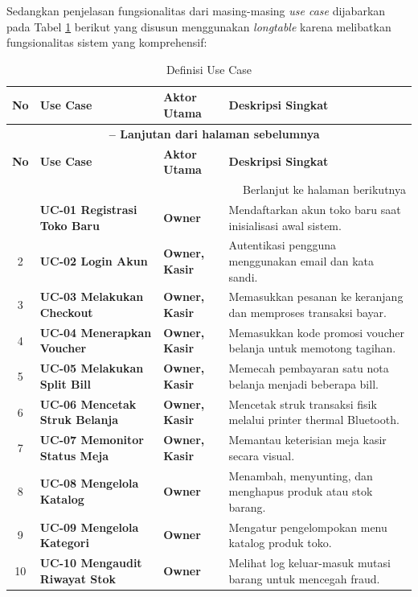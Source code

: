 Sedangkan penjelasan fungsionalitas dari masing-masing \textit{use case} dijabarkan pada Tabel \ref{tab:usecase} berikut yang disusun menggunakan \textit{longtable} karena melibatkan fungsionalitas sistem yang komprehensif:

\begin{center}
\fontsize{10pt}{12pt}\selectfont
\begin{longtable}{|c|>{\bfseries}p{3.5cm}|>{\bfseries}p{2.5cm}|p{6cm}|}
\caption{Definisi Use Case} \label{tab:usecase} \\
\hline
\textbf{No} & \textbf{Use Case} & \textbf{Aktor Utama} & \textbf{Deskripsi Singkat} \\
\hline
\endfirsthead
\multicolumn{4}{c}{{\bfseries \tablename\ \thetable{} -- Lanjutan dari halaman sebelumnya}} \\
\hline
\textbf{No} & \textbf{Use Case} & \textbf{Aktor Utama} & \textbf{Deskripsi Singkat} \\
\hline
\endhead
\hline
\multicolumn{4}{|r|}{{Berlanjut ke halaman berikutnya}} \\
\hline
\endfoot
\hline
\endlastfoot
1 & UC-01 Registrasi Toko Baru & Owner & Mendaftarkan akun toko baru saat inisialisasi awal sistem. \\
\hline
2 & UC-02 Login Akun & Owner, Kasir & Autentikasi pengguna menggunakan email dan kata sandi. \\
\hline
3 & UC-03 Melakukan Checkout & Owner, Kasir & Memasukkan pesanan ke keranjang dan memproses transaksi bayar. \\
\hline
4 & UC-04 Menerapkan Voucher & Owner, Kasir & Memasukkan kode promosi voucher belanja untuk memotong tagihan. \\
\hline
5 & UC-05 Melakukan Split Bill & Owner, Kasir & Memecah pembayaran satu nota belanja menjadi beberapa bill. \\
\hline
6 & UC-06 Mencetak Struk Belanja & Owner, Kasir & Mencetak struk transaksi fisik melalui printer thermal Bluetooth. \\
\hline
7 & UC-07 Memonitor Status Meja & Owner, Kasir & Memantau keterisian meja kasir secara visual. \\
\hline
8 & UC-08 Mengelola Katalog & Owner & Menambah, menyunting, dan menghapus produk atau stok barang. \\
\hline
9 & UC-09 Mengelola Kategori & Owner & Mengatur pengelompokan menu katalog produk toko. \\
\hline
10 & UC-10 Mengaudit Riwayat Stok & Owner & Melihat log keluar-masuk mutasi barang untuk mencegah fraud. \\

\end{longtable}
\end{center}
